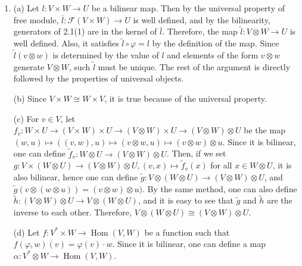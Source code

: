 \begin{enumerate}
\item (a) Let $l\colon V \times W \rightarrow U$ be a bilinear map. 
Then by the universal property of free module, $\bar{l}\colon \mathcal{F}(V \times W) \rightarrow U$ is well defined, 
and by the bilinearity, generators of 2.1(1) are in the kernel of $\bar{l}$. 
Therefore, the map $\tilde{l}\colon V \otimes W \rightarrow U$ is well defined. 
Also, it satisfies $\tilde{l} \circ \varphi=l$ by the definition of the map. 
Since $\tilde{l}(v \otimes w)$ is determined by the value of $l$ and elements of the form $v \otimes w$ generate $V \otimes W$, such $\tilde{l}$ must be unique. 
The rest of the argument is directly followed by the properties of universal objects.

(b) Since $V \times W \cong W \times V$, it is true because of the universal property.

(c) For $v \in V$, let $f_{v}\colon W \times U \rightarrow(V \times W) \times U \rightarrow(V \otimes W) \times U \rightarrow(V \otimes W) \otimes U$ 
be the map $(w, u) \mapsto ((v, w), u) \mapsto(v \otimes w, u) \mapsto(v \otimes w) \otimes u$. 
Since it is bilinear, one can define $\tilde{f}_{v}\colon W \otimes U \rightarrow(V \otimes W) \otimes U$. 
Then, if we set $g\colon V \times(W \otimes U) \rightarrow(V \otimes W) \otimes U,(v, x) \mapsto \tilde{f}_{v}(x)$ for all $x \in W \otimes U$, it is also bilinear, 
hence one can define $\tilde{g}\colon V \otimes(W \otimes U) \rightarrow(V \otimes W) \otimes U$, 
and $\tilde{g}(v \otimes(w \otimes u))=(v \otimes w) \otimes u)$. 
By the same method, one can also define $\tilde{h}\colon(V \otimes W) \otimes U \rightarrow V \otimes(W \otimes U)$, 
and it is easy to see that $\tilde{g}$ and $\tilde{h}$ are the inverse to each other. 
Therefore, $V \otimes(W \otimes U) \cong(V \otimes W) \otimes U$.

(d) Let $f\colon V^{*} \times W \rightarrow \operatorname{Hom}(V, W)$ be a function such that $f(\varphi, w)(v)=\varphi(v) \cdot w$. 
Since it is bilinear, one can define a map $\alpha\colon V^{*} \otimes W \rightarrow \operatorname{Hom}(V, W)$.


\end{enumerate}
